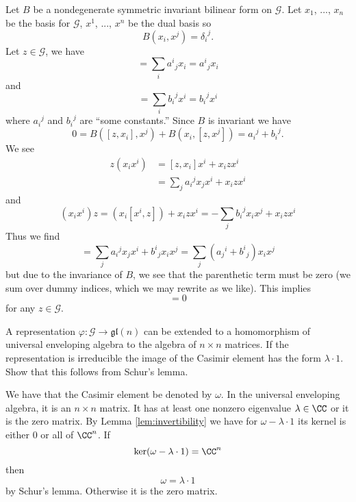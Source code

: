 \answer
Let $B$ be a nondegenerate symmetric invariant bilinear form on
$\mathscr{G}$. Let $x_{1}$, ..., $x_{n}$ be the basis for
$\mathscr{G}$, $x^{1}$, ..., $x^{n}$ be the dual basis so 
\begin{equation}
B(x_{i},x^{j})={\delta_{i}}^{j}.
\end{equation}
Let $z\in\mathscr{G}$, we have
\begin{equation}
[z,x_{j}]=\sum_{i}{a^{i}}_{j}x_{i}={a^{i}}_{j}x_{i}
\end{equation}
and
\begin{equation}
[z,x^{j}]=\sum_{i}{b_{i}}^{j}x^{i}={b_{i}}^{j}x^{i}
\end{equation}
where ${a_{i}}^{j}$ and ${b_{i}}^{j}$ are ``some constants.'' Since $B$ is
invariant we have
\begin{equation}
0=B([z,x_{i}],x^{j})+B(x_{i},[z,x^{j}])={a_{i}}^{j}+{b_{i}}^{j}.
\end{equation}
We see
\begin{subequations}
\begin{align}
z(x_{i}x^{i})&=[z,x_{i}]x^{i}+x_{i}zx^{i}\\
&=\sum_{j}{a_{i}}^{j}x_jx^{i}+x_{i}zx^{i}
\end{align}
\end{subequations}
and
\begin{equation}
(x_{i}x^{i})z=(x_{i}[x^{i},z])+x_{i}zx^{i}=-\sum_{j}{b_{i}}^{j}x_{i}x^{j}+x_{i}zx^{i}
\end{equation}
Thus we find
\begin{equation}
[z,x_{i}x^{i}]=\sum_{j}{a_{i}}^{j}x_{j}x^{i}+{b^{i}}_{j}x_{i}x^{j}=\sum_{j}({a_{j}}^{i}+{b^{i}}_{j})x_{i}x^{j}
\end{equation}
but due to the invariance of $B$, we see that the parenthetic
term must be zero (we sum over dummy indices, which we may
rewrite as we like). This implies
\begin{equation}
[z,x_{i}x^{i}]=0
\end{equation}
for any $z\in\mathscr{G}$.

\begin{exercise}
A representation $\varphi\colon\mathscr{G}\to\mathfrak{gl}(n)$
can be extended to a homomorphism of universal enveloping algebra
to the algebra of $n\times n$ matrices. If the representation is
irreducible the image of the Casimir element has the form
$\lambda\cdot1$. Show that this follows from Schur's lemma.
\end{exercise}

\answer
We have that the Casimir element be denoted by $\omega$. In the
universal enveloping algebra, it is an $n\times n$ matrix. It has
at least one nonzero eigenvalue $\lambda\in\CC$ or it is the
zero matrix. By Lemma \ref{lem:invertibility} we have for
$\omega-\lambda\cdot1$ its kernel is either 0 or all of
$\CC^{n}$. If 
\begin{equation}
\ker(\omega-\lambda\cdot1)=\CC^{n}
\end{equation}
then 
\begin{equation}
\omega=\lambda\cdot1
\end{equation}
by Schur's lemma. Otherwise it is the zero matrix.

